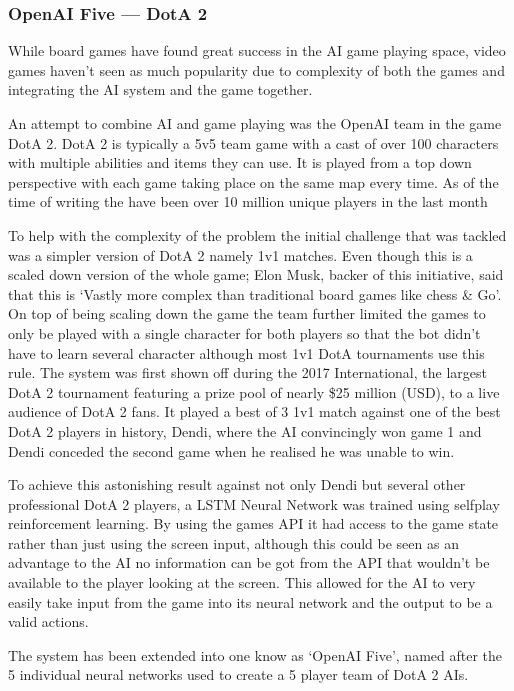 \documentclass[a4paper]{article}
\begin{document}
\subsubsection{OpenAI Five --- DotA 2}
While board games have found great success in the AI game playing space, video games haven't seen as much popularity due to complexity of both the games and integrating the AI system and the game together.
\par
An attempt to combine AI and game playing was the OpenAI team in the game DotA 2.
DotA 2 is typically a 5v5 team game with a cast of over 100 characters with multiple abilities and items they can use.
It is played from a top down perspective with each game taking place on the same map every time.
As of the time of writing the have been over 10 million unique players in the last month\cite{DotA2}
\par
To help with the complexity of the problem the initial challenge that was tackled was a simpler version of DotA 2 namely 1v1 matches.
Even though this is a scaled down version of the whole game; Elon Musk, backer of this initiative, said that this is `Vastly more complex than traditional board games like chess \& Go'\cite{OpenAI}.
On top of being scaling down the game the team further limited the games to only be played with a single character for both players so that the bot didn't have to learn several character although most 1v1 DotA tournaments use this rule.
The system was first shown off during the 2017 International, the largest DotA 2 tournament featuring a prize pool of nearly \$25 million (USD), to a live audience of DotA 2 fans.
It played a best of 3 1v1 match against one of the best DotA 2 players in history, Dendi, where the AI convincingly won game 1 and Dendi conceded the second game when he realised he was unable to win.
\par
To achieve this astonishing result against not only Dendi but several other professional DotA 2 players, a LSTM Neural Network was trained using selfplay reinforcement learning.
By using the games API it had access to the game state rather than just using the screen input, although this could be seen as an advantage to the AI no information can be got from the API that wouldn't be available to the player looking at the screen.
This allowed for the AI to very easily take input from the game into its neural network and the output to be a valid actions.
\par
The system has been extended into one know as `OpenAI Five', named after the 5 individual neural networks used to create a 5 player team of DotA 2 AIs\cite{OpenAIFive}.
\end{document}
